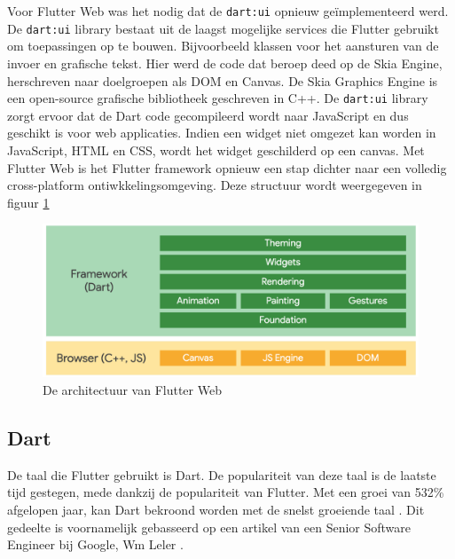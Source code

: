 Voor Flutter Web was het nodig dat de \verb|dart:ui| opnieuw geïmplementeerd werd. De \verb|dart:ui| library bestaat uit de laagst mogelijke services die Flutter gebruikt om toepassingen op te bouwen. Bijvoorbeeld klassen voor het aansturen van de invoer en grafische tekst. Hier werd de code dat beroep deed op de Skia Engine, herschreven naar doelgroepen als DOM en Canvas. De Skia Graphics Engine is een open-source grafische bibliotheek geschreven in C++. De \verb|dart:ui| library zorgt ervoor dat de Dart code gecompileerd wordt naar JavaScript en dus geschikt is voor web applicaties. Indien een widget niet omgezet kan worden in JavaScript, HTML en CSS, wordt het widget geschilderd op een canvas.
\newline
Met Flutter Web is het Flutter framework opnieuw een stap dichter naar een volledig cross-platform ontiwkkelingsomgeving.
Deze structuur wordt weergegeven in figuur \ref{fig:flutter-web-architecture}
\begin{figure}[H]
    \includegraphics[width=\linewidth]{img/stand-van-zaken/flutter-web-architecture.png}
    \caption{De architectuur van Flutter Web \textcite{Flutter2019}}
    \label{fig:flutter-web-architecture}
\end{figure}


\subsection{Dart}
\label{ch:dart}
De taal die Flutter gebruikt is Dart. De populariteit van deze taal is de laatste tijd gestegen, mede dankzij de populariteit van Flutter. Met een groei van 532\% afgelopen jaar, kan Dart bekroond worden met de snelst groeiende taal \textcite{Chan2019}. 
Dit gedeelte is voornamelijk gebasseerd op een artikel van een Senior Software Engineer bij Google, Wm Leler \textcite{Leler2017a}.

